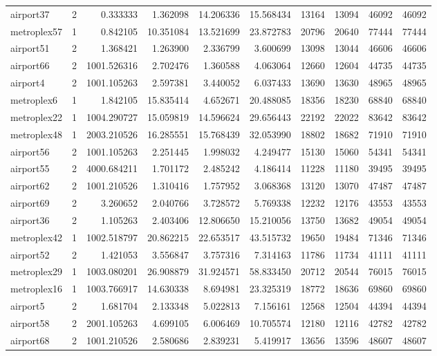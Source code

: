 \begin{longtable}{|l|r|r|r|r|r|r|r|r|r|}
airport37 & 2 & 0.333333 & 1.362098 & 14.206336 & 15.568434 & 13164 & 13094 & 46092 & 46092 \\
metroplex57 & 1 & 0.842105 & 10.351084 & 13.521699 & 23.872783 & 20796 & 20640 & 77444 & 77444 \\
airport51 & 2 & 1.368421 & 1.263900 & 2.336799 & 3.600699 & 13098 & 13044 & 46606 & 46606 \\
airport66 & 2 & 1001.526316 & 2.702476 & 1.360588 & 4.063064 & 12660 & 12604 & 44735 & 44735 \\
airport4 & 2 & 1001.105263 & 2.597381 & 3.440052 & 6.037433 & 13690 & 13630 & 48965 & 48965 \\
metroplex6 & 1 & 1.842105 & 15.835414 & 4.652671 & 20.488085 & 18356 & 18230 & 68840 & 68840 \\
metroplex22 & 1 & 1004.290727 & 15.059819 & 14.596624 & 29.656443 & 22192 & 22022 & 83642 & 83642 \\
metroplex48 & 1 & 2003.210526 & 16.285551 & 15.768439 & 32.053990 & 18802 & 18682 & 71910 & 71910 \\
airport56 & 2 & 1001.105263 & 2.251445 & 1.998032 & 4.249477 & 15130 & 15060 & 54341 & 54341 \\
airport55 & 2 & 4000.684211 & 1.701172 & 2.485242 & 4.186414 & 11228 & 11180 & 39495 & 39495 \\
airport62 & 2 & 1001.210526 & 1.310416 & 1.757952 & 3.068368 & 13120 & 13070 & 47487 & 47487 \\
airport69 & 2 & 3.260652 & 2.040766 & 3.728572 & 5.769338 & 12232 & 12176 & 43553 & 43553 \\
airport36 & 2 & 1.105263 & 2.403406 & 12.806650 & 15.210056 & 13750 & 13682 & 49054 & 49054 \\
metroplex42 & 1 & 1002.518797 & 20.862215 & 22.653517 & 43.515732 & 19650 & 19484 & 71346 & 71346 \\
airport52 & 2 & 1.421053 & 3.556847 & 3.757316 & 7.314163 & 11786 & 11734 & 41111 & 41111 \\
metroplex29 & 1 & 1003.080201 & 26.908879 & 31.924571 & 58.833450 & 20712 & 20544 & 76015 & 76015 \\
metroplex16 & 1 & 1003.766917 & 14.630338 & 8.694981 & 23.325319 & 18772 & 18636 & 69860 & 69860 \\
airport5 & 2 & 1.681704 & 2.133348 & 5.022813 & 7.156161 & 12568 & 12504 & 44394 & 44394 \\
airport58 & 2 & 2001.105263 & 4.699105 & 6.006469 & 10.705574 & 12180 & 12116 & 42782 & 42782 \\
airport68 & 2 & 1001.210526 & 2.580686 & 2.839231 & 5.419917 & 13656 & 13596 & 48607 & 48607 \\

\end{longtable}
